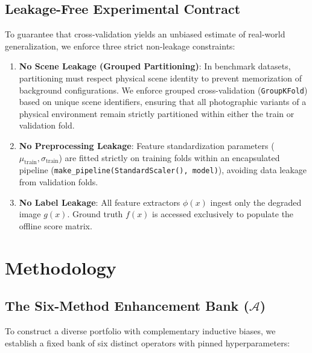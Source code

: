 \documentclass[journal]{IEEEtran}
\begin{document}
\subsection{Leakage-Free Experimental Contract}
To guarantee that cross-validation yields an unbiased estimate of real-world generalization, we enforce three strict non-leakage constraints:
\begin{enumerate}
    \item \textbf{No Scene Leakage (Grouped Partitioning)}: In benchmark datasets, partitioning must respect physical scene identity to prevent memorization of background configurations. We enforce grouped cross-validation (\texttt{GroupKFold}) based on unique scene identifiers, ensuring that all photographic variants of a physical environment remain strictly partitioned within either the train or validation fold.
    \item \textbf{No Preprocessing Leakage}: Feature standardization parameters ($\mu_{\text{train}}, \sigma_{\text{train}}$) are fitted strictly on training folds within an encapsulated pipeline (\texttt{make\_pipeline(StandardScaler(), model)}), avoiding data leakage from validation folds.
    \item \textbf{No Label Leakage}: All feature extractors $\phi(x)$ ingest only the degraded image $g(x)$. Ground truth $f(x)$ is accessed exclusively to populate the offline score matrix.
\end{enumerate}

\section{Methodology}

\subsection{The Six-Method Enhancement Bank (\texorpdfstring{$\mathcal{A}$}{A})}
To construct a diverse portfolio with complementary inductive biases, we establish a fixed bank of six distinct operators with pinned hyperparameters:
\end{document}
